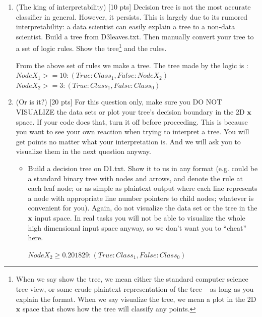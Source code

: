 \documentclass[a4paper]{article}
\theoremstyle{definition}
\def\x{\mathbf x}
\newenvironment{soln}{
    \leavevmode\color{blue}\ignorespaces
}{}
\begin{document}
\begin{enumerate}
\item (The king of interpretability)  [10 pts] Decision tree is not the most accurate classifier in general.  However, it persists.  This is largely due to its rumored interpretability: a data scientist can easily explain a tree to a non-data scientist.  Build a tree from D3leaves.txt.  Then manually convert your tree to a set of logic rules.  Show the tree\footnote{When we say show the tree, we mean either the standard computer science tree view, or some crude plaintext representation of the tree -- as long as you explain the format.  When we say visualize the tree, we mean a plot in the 2D $\x$ space that shows how the tree will classify any points.} and the rules. \\
\begin{soln}
    From the above set of rules we make a tree. The tree made by the logic is :\\

    $Node X_1>=10 : (True: Class_1, False: NodeX_2)$\\
    $Node X_2>=3  : (True: Class_1, False: Class_0)$

\end{soln}

\item (Or is it?)  [20 pts] For this question only, make sure you DO NOT VISUALIZE the data sets or plot your tree's decision boundary in the 2D $\x$ space.  If your code does that, turn it off before proceeding.  This is because you want to see your own reaction when trying to interpret a tree.  You will get points no matter what your interpretation is.
And we will ask you to visualize them in the next question anyway.
  \begin{itemize}
  
  \item Build a decision tree on D1.txt.  Show it to us in any format (e.g. could be a standard binary tree with nodes and arrows, and denote the rule at each leaf node; or as simple as plaintext output where each line represents a node with appropriate line number pointers to child nodes; whatever is convenient for you). Again, do not visualize the data set or the tree in the $\x$ input space.  In real tasks you will not be able to visualize the whole high dimensional input space anyway, so we don't want you to ``cheat'' here.
  \\
  \begin{soln}
      $Node X_2\ge0.201829:(True : Class_1, False: Class_0) $
  \end{soln}
  

\end{itemize}
\end{enumerate}
\end{document}
